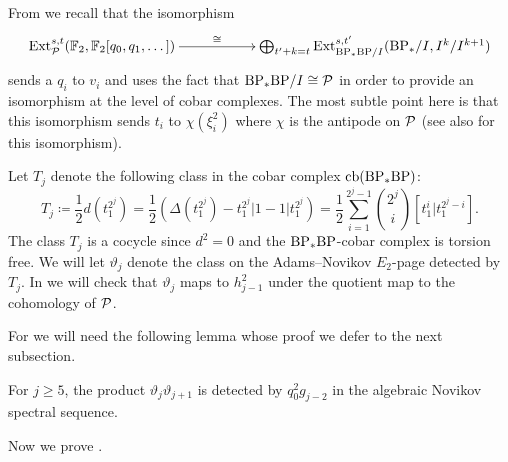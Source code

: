 From  we recall that the isomorphism
$$\xymatrix{
\Ext^{s,t}_{\P}(\F_2, \F_2[q_0,q_1,\dots]) \ar[rr]^-{\cong} & & \bigoplus_{t'+k=t} \Ext_{\BP_*\BP/I}^{s,t'}(\BP_*/I, I^k/I^{k+1})
}$$
sends a $q_i$ to $v_i$ and uses the fact that $\BP_*\BP/I \cong \P$ in order to provide an isomorphism at the level of cobar complexes. The most subtle point here is that this isomorphism sends $t_i$ to $\chi(\xi_i^2)$ where $\chi$ is the antipode on $\P$ (see also \cite{AndrewsMiller, MillerSquare, RavenelGreenBook} for this isomorphism).


\begin{dfn} \label{dfn:Tj}
  Let $T_j$ denote the following class in the cobar complex $\mathrm{cb}(\BP_*\BP)$:
  \[ T_j \coloneqq \frac{1}{2} d(t_1^{2^j}) = \frac{1}{2} \left( \Delta( t_1^{2^{j}} ) - t_1^{2^j}|1 - 1|t_1^{2^j} \right) = \frac{1}{2} \sum_{i=1}^{2^{j} -1} \binom{2^{j}}{i} [t_1^i | t_1^{2^{j} - i}]. \]
  The class $T_j$ is a cocycle since $d^2=0$ and the $\BP_*\BP$-cobar complex is torsion free.
  We will let $\vartheta_j$ denote the class on the Adams--Novikov $E_2$-page detected by $T_j$.
  In  we will check that $\vartheta_j$ maps to $h_{j-1}^2$ under the quotient map to the cohomology of $\P$.
\end{dfn}



For  we will need the following lemma whose proof we defer to the next subsection.

\begin{lem} \label{lem:prod-small}
  For $j \geq 5$, the product $ \vartheta_j\vartheta_{j+1} $ is detected by $q_0^2g_{j-2}$ in the algebraic Novikov spectral sequence.
\end{lem}

Now we prove .

